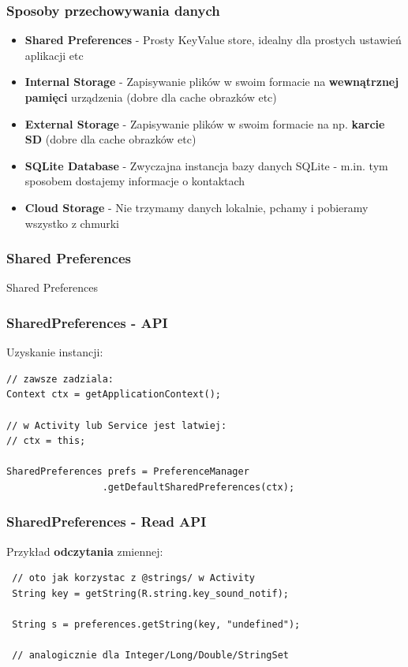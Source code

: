 \documentclass{beamer}
\begin{document}
\begin{frame}\frametitle{Sposoby przechowywania danych}
\begin{itemize}
 \item  \textbf{Shared Preferences} - Prosty KeyValue store, idealny dla prostych ustawień aplikacji etc
 \pause \item \textbf{Internal Storage} - Zapisywanie plików w swoim formacie na \textbf{wewnątrznej pamięci} urządzenia (dobre dla cache obrazków etc)
 \pause \item \textbf{External Storage} - Zapisywanie plików w swoim formacie na np. \textbf{karcie SD} (dobre dla cache obrazków etc)
 \pause \item \textbf{SQLite Database} - Zwyczajna instancja bazy danych SQLite - m.in. tym sposobem dostajemy informacje o kontaktach
 \pause \item \textbf{Cloud Storage} - Nie trzymamy danych lokalnie, pchamy i pobieramy wszystko z chmurki
\end{itemize}
\end{frame}


\begin{frame}\frametitle{Shared Preferences}
\begin{center}
 \Huge{Shared Preferences} 
\end{center}
\end{frame}

\begin{frame}[fragile]\frametitle{SharedPreferences - API}
Uzyskanie instancji:
\begin{lstlisting}
// zawsze zadziala:
Context ctx = getApplicationContext(); 

// w Activity lub Service jest latwiej:
// ctx = this;

SharedPreferences prefs = PreferenceManager
                 .getDefaultSharedPreferences(ctx);
\end{lstlisting}
\end{frame}


\begin{frame}[fragile]\frametitle{SharedPreferences - Read API}
 Przykład \textbf{odczytania} zmiennej:
\begin{lstlisting}
 // oto jak korzystac z @strings/ w Activity
 String key = getString(R.string.key_sound_notif);

 String s = preferences.getString(key, "undefined");
 
 // analogicznie dla Integer/Long/Double/StringSet
\end{lstlisting}
\end{frame}
\end{document}
